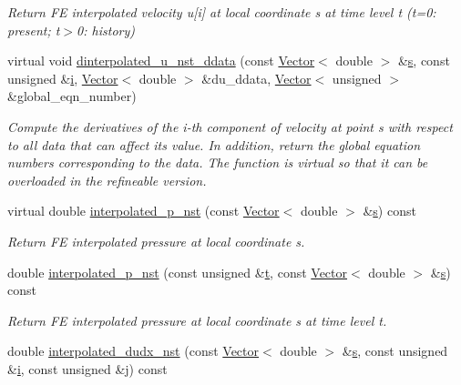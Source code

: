\begin{DoxyCompactItemize}
\begin{DoxyCompactList}\small\item\em Return FE interpolated velocity u\mbox{[}i\mbox{]} at local coordinate s at time level t (t=0\+: present; t$>$0\+: history) \end{DoxyCompactList}\item 
virtual void \hyperlink{classoomph_1_1NavierStokesEquations_aa516b523d6c3b83a01c1bd1e1f9569fe}{dinterpolated\+\_\+u\+\_\+nst\+\_\+ddata} (const \hyperlink{classoomph_1_1Vector}{Vector}$<$ double $>$ \&\hyperlink{cfortran_8h_ab7123126e4885ef647dd9c6e3807a21c}{s}, const unsigned \&\hyperlink{cfortran_8h_adb50e893b86b3e55e751a42eab3cba82}{i}, \hyperlink{classoomph_1_1Vector}{Vector}$<$ double $>$ \&du\+\_\+ddata, \hyperlink{classoomph_1_1Vector}{Vector}$<$ unsigned $>$ \&global\+\_\+eqn\+\_\+number)
\begin{DoxyCompactList}\small\item\em Compute the derivatives of the i-\/th component of velocity at point s with respect to all data that can affect its value. In addition, return the global equation numbers corresponding to the data. The function is virtual so that it can be overloaded in the refineable version. \end{DoxyCompactList}\item 
virtual double \hyperlink{classoomph_1_1NavierStokesEquations_aaffc8d182f6bdf382ccbdf54cf3c4e55}{interpolated\+\_\+p\+\_\+nst} (const \hyperlink{classoomph_1_1Vector}{Vector}$<$ double $>$ \&\hyperlink{cfortran_8h_ab7123126e4885ef647dd9c6e3807a21c}{s}) const
\begin{DoxyCompactList}\small\item\em Return FE interpolated pressure at local coordinate s. \end{DoxyCompactList}\item 
double \hyperlink{classoomph_1_1NavierStokesEquations_a8a4b2d8322ed9212c41d9ec93719902d}{interpolated\+\_\+p\+\_\+nst} (const unsigned \&\hyperlink{cfortran_8h_af6f0bd3dc13317f895c91323c25c2b8f}{t}, const \hyperlink{classoomph_1_1Vector}{Vector}$<$ double $>$ \&\hyperlink{cfortran_8h_ab7123126e4885ef647dd9c6e3807a21c}{s}) const
\begin{DoxyCompactList}\small\item\em Return FE interpolated pressure at local coordinate s at time level t. \end{DoxyCompactList}\item 
double \hyperlink{classoomph_1_1NavierStokesEquations_a3fa34303035c253c66c0f69752e5949e}{interpolated\+\_\+dudx\+\_\+nst} (const \hyperlink{classoomph_1_1Vector}{Vector}$<$ double $>$ \&\hyperlink{cfortran_8h_ab7123126e4885ef647dd9c6e3807a21c}{s}, const unsigned \&\hyperlink{cfortran_8h_adb50e893b86b3e55e751a42eab3cba82}{i}, const unsigned \&j) const

\end{DoxyCompactItemize}
